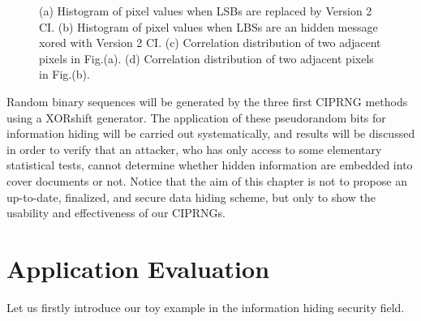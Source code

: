 \begin{figure}
{}
\caption{ (a) Histogram of pixel values when LSBs are replaced by Version 2 CI. (b) Histogram of pixel values when LBSs are an hidden message xored with Version 2 CI. (c) Correlation distribution of two adjacent pixels in Fig.(a). (d) Correlation distribution of two adjacent pixels in Fig.(b).  }
\label{New_CI_hiding}
\end{figure}
Random binary sequences will be generated by the three first CIPRNG methods using a XORshift generator.
The application of these pseudorandom bits for information hiding will be carried out systematically, and results will be discussed in order to verify that an attacker, who has only access to some elementary statistical tests,
cannot determine whether hidden information are embedded into cover documents or not.
Notice that the aim of this chapter is not to propose an up-to-date, finalized,
and secure data hiding scheme, but only to show the usability and effectiveness 
of our CIPRNGs.

\section{Application Evaluation}
\label{sec:application}

Let us firstly introduce our toy example in the information hiding security field. 


